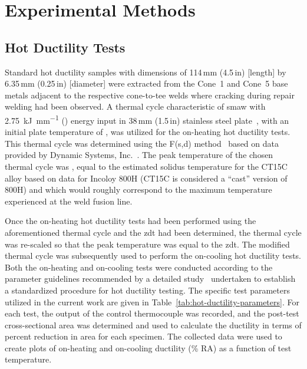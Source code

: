 \chapter{Experimental Methods} \label{ch:experimental-methods}

\section{Hot Ductility Tests}
Standard hot ductility samples with dimensions of 114\,mm (4.5\,in) [length] by 6.35\,mm (0.25\,in) [diameter] were extracted from the Cone~1 and Cone~5 base metals adjacent to the respective cone-to-tee welds where cracking during repair welding had been observed.  A thermal cycle characteristic of \gls{smaw} with \SI[round-mode=places,round-precision=2]{2.75}{\kilo\joule\per\milli\meter} () energy input in 38\,mm (1.5\,in) stainless steel plate~\cite{nippes_heat-affected_1955}, with an initial plate temperature of , was utilized for the on-heating hot ductility tests.  This thermal cycle was determined using the F(s,d) method~\cite{nippes_cooling_1949} based on data provided by Dynamic Systems, Inc.~\cite{duffers_haz_1989}. The peak temperature of the chosen thermal cycle was , equal to the estimated solidus temperature for the CT15C alloy based on data for Incoloy 800H (CT15C is considered a ``cast'' version of 800H) and which would roughly correspond to the maximum temperature experienced at the weld fusion line.

Once the on-heating hot ductility tests had been performed using the aforementioned thermal cycle and the \gls{zdt} had been determined, the thermal cycle was re-scaled so that the peak temperature was equal to the \gls{zdt}. The modified thermal cycle was subsequently used to perform the on-cooling hot ductility tests.  Both the on-heating and on-cooling tests were conducted according to the parameter guidelines recommended by a detailed study~\cite{lundin_standardization_1990_experiment} undertaken to establish a standardized procedure for hot ductility testing.  The specific test parameters utilized in the current work are given in Table~\ref{tab:hot-ductility-parameters}.  For each test, the output of the control thermocouple was recorded, and the post-test cross-sectional area was determined and used to calculate the ductility in terms of percent reduction in area for each specimen.  The collected data were used to create plots of on-heating and on-cooling ductility (\% RA) as a function of test temperature.

